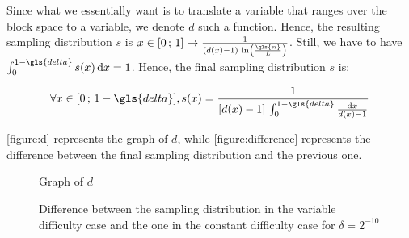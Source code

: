 Since what we essentially want is to translate a variable that ranges over the block space to a variable, we denote \(d\) such a function. Hence, the resulting sampling distribution \(s\) is \(x\in[0\,;\,1]\mapsto\frac{1}{(d(x) - 1)\,\ln\left(\frac{\gls{n}}{L}\right)}\). Still, we have to have \(\int_0^{1-\gls{delta}}s(x)\,\mathrm{d}x=1\). Hence, the final sampling distribution \(s\) is:

\[\forall x\in[0\,;\,1-\gls{delta}],s(x)=\frac{1}{[d(x)-1]\,\int_{0}^{1-\gls{delta}}\frac{\mathrm{d}x}{d(x)-1}}\]

\autoref{figure:d} represents the graph of \(d\), while \autoref{figure:difference} represents the difference between the final sampling distribution and the previous one.
        
\begin{figure}[ht]
  \centering
  \caption{Graph of \(d\)}
  \label{figure:d}
\end{figure}

\begin{figure}[ht]
  \centering
  \caption{Difference between the sampling distribution in the variable difficulty case and the one in the constant difficulty case for \(\delta=2^{-10}\)}
  \label{figure:difference}
\end{figure}
